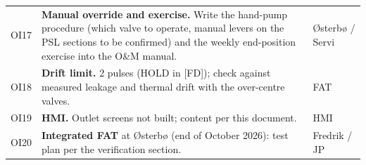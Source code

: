 \documentclass[11pt,a4paper]{article}
\begin{document}
\begin{small}
\begin{longtable}{@{}lP{100mm}P{30mm}@{}}
OI17 & \textbf{Manual override and exercise.} Write the hand-pump procedure (which valve to operate, manual levers on the PSL
  sections to be confirmed) and the weekly end-position exercise into the O\&M manual. & Østerbø / Servi \\
OI18 & \textbf{Drift limit.} 2 pulses (HOLD in [FD]); check against measured leakage and thermal drift with the over-centre valves. & FAT \\
OI19 & \textbf{HMI.} Outlet screens not built; content per this document. & HMI \\
OI20 & \textbf{Integrated FAT} at Østerbø (end of October 2026): test plan per the verification section. & Fredrik / JP \\
\end{longtable}
\end{small}
\end{document}
